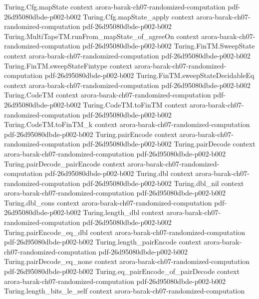 \begin{theorem}
  {Turing.Cfg.mapState}
  {context}
  {arora-barak-ch07-randomized-computation}
  {pdf-26d95080dbde-p002-b002}
\proofstep
  {Turing.Cfg.mapState_apply}
  {context}
  {arora-barak-ch07-randomized-computation}
  {pdf-26d95080dbde-p002-b002}
\proofstep
  {Turing.MultiTapeTM.runFrom_mapState_of_agreeOn}
  {context}
  {arora-barak-ch07-randomized-computation}
  {pdf-26d95080dbde-p002-b002}
\proofstep
  {Turing.FinTM.SweepState}
  {context}
  {arora-barak-ch07-randomized-computation}
  {pdf-26d95080dbde-p002-b002}
\proofstep
  {Turing.FinTM.sweepStateFintype}
  {context}
  {arora-barak-ch07-randomized-computation}
  {pdf-26d95080dbde-p002-b002}
\proofstep
  {Turing.FinTM.sweepStateDecidableEq}
  {context}
  {arora-barak-ch07-randomized-computation}
  {pdf-26d95080dbde-p002-b002}
\proofstep
  {Turing.CodeTM}
  {context}
  {arora-barak-ch07-randomized-computation}
  {pdf-26d95080dbde-p002-b002}
\proofstep
  {Turing.CodeTM.toFinTM}
  {context}
  {arora-barak-ch07-randomized-computation}
  {pdf-26d95080dbde-p002-b002}
\proofstep
  {Turing.CodeTM.toFinTM_k}
  {context}
  {arora-barak-ch07-randomized-computation}
  {pdf-26d95080dbde-p002-b002}
\proofstep
  {Turing.pairEncode}
  {context}
  {arora-barak-ch07-randomized-computation}
  {pdf-26d95080dbde-p002-b002}
\proofstep
  {Turing.pairDecode}
  {context}
  {arora-barak-ch07-randomized-computation}
  {pdf-26d95080dbde-p002-b002}
\proofstep
  {Turing.pairDecode_pairEncode}
  {context}
  {arora-barak-ch07-randomized-computation}
  {pdf-26d95080dbde-p002-b002}
\proofstep
  {Turing.dbl}
  {context}
  {arora-barak-ch07-randomized-computation}
  {pdf-26d95080dbde-p002-b002}
\proofstep
  {Turing.dbl_nil}
  {context}
  {arora-barak-ch07-randomized-computation}
  {pdf-26d95080dbde-p002-b002}
\proofstep
  {Turing.dbl_cons}
  {context}
  {arora-barak-ch07-randomized-computation}
  {pdf-26d95080dbde-p002-b002}
\proofstep
  {Turing.length_dbl}
  {context}
  {arora-barak-ch07-randomized-computation}
  {pdf-26d95080dbde-p002-b002}
\proofstep
  {Turing.pairEncode_eq_dbl}
  {context}
  {arora-barak-ch07-randomized-computation}
  {pdf-26d95080dbde-p002-b002}
\proofstep
  {Turing.length_pairEncode}
  {context}
  {arora-barak-ch07-randomized-computation}
  {pdf-26d95080dbde-p002-b002}
\proofstep
  {Turing.pairDecode_eq_none}
  {context}
  {arora-barak-ch07-randomized-computation}
  {pdf-26d95080dbde-p002-b002}
\proofstep
  {Turing.eq_pairEncode_of_pairDecode}
  {context}
  {arora-barak-ch07-randomized-computation}
  {pdf-26d95080dbde-p002-b002}
\proofstep
  {Turing.length_bits_le_self}
  {context}
  {arora-barak-ch07-randomized-computation}

\end{theorem}
